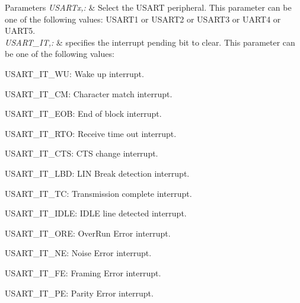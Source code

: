 \begin{DoxyParams}{Parameters}
{\em U\-S\-A\-R\-Tx,\-:} & Select the U\-S\-A\-R\-T peripheral. This parameter can be one of the following values\-: U\-S\-A\-R\-T1 or U\-S\-A\-R\-T2 or U\-S\-A\-R\-T3 or U\-A\-R\-T4 or U\-A\-R\-T5. \\
\hline
{\em U\-S\-A\-R\-T\-\_\-\-I\-T,\-:} & specifies the interrupt pending bit to clear. This parameter can be one of the following values\-: \begin{DoxyItemize}
\item U\-S\-A\-R\-T\-\_\-\-I\-T\-\_\-\-W\-U\-: Wake up interrupt. \item U\-S\-A\-R\-T\-\_\-\-I\-T\-\_\-\-C\-M\-: Character match interrupt. \item U\-S\-A\-R\-T\-\_\-\-I\-T\-\_\-\-E\-O\-B\-: End of block interrupt. \item U\-S\-A\-R\-T\-\_\-\-I\-T\-\_\-\-R\-T\-O\-: Receive time out interrupt. \item U\-S\-A\-R\-T\-\_\-\-I\-T\-\_\-\-C\-T\-S\-: C\-T\-S change interrupt. \item U\-S\-A\-R\-T\-\_\-\-I\-T\-\_\-\-L\-B\-D\-: L\-I\-N Break detection interrupt. \item U\-S\-A\-R\-T\-\_\-\-I\-T\-\_\-\-T\-C\-: Transmission complete interrupt. \item U\-S\-A\-R\-T\-\_\-\-I\-T\-\_\-\-I\-D\-L\-E\-: I\-D\-L\-E line detected interrupt. \item U\-S\-A\-R\-T\-\_\-\-I\-T\-\_\-\-O\-R\-E\-: Over\-Run Error interrupt. \item U\-S\-A\-R\-T\-\_\-\-I\-T\-\_\-\-N\-E\-: Noise Error interrupt. \item U\-S\-A\-R\-T\-\_\-\-I\-T\-\_\-\-F\-E\-: Framing Error interrupt. \item U\-S\-A\-R\-T\-\_\-\-I\-T\-\_\-\-P\-E\-: Parity Error interrupt. \end{DoxyItemize}
\\
\hline
\end{DoxyParams}
